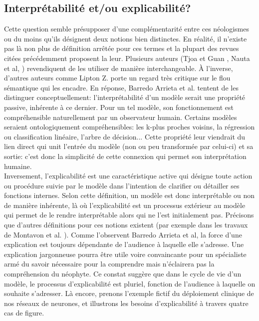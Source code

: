 \subsection{Interprétabilité et/ou explicabilité?} Cette question semble présupposer d'une complémentarité entre ces néologismes ou du moins qu'ils désignent deux notions bien distinctes. En réalité, il n'existe pas là non plus de définition arrêtée pour ces termes et la plupart des revues citées précédemment proposent la leur. Plusieurs auteurs (Tjoa et Guan \cite{tjoaSurveyExplainableArtificial2021a}, Nauta et al, \cite{nautaAnecdotalEvidenceQuantitative2023}) revendiquent de les utiliser de manière interchangeable. À l'inverse, d'autres auteurs comme Lipton Z. \cite{liptonMythosModelInterpretability2018} porte un regard très critique sur le flou sémantique qui les encadre. En réponse, Barredo Arrieta et al. \cite{barredoarrietaExplainableArtificialIntelligence2020} tentent de les distinguer conceptuellement: l'interprétabilité d'un modèle serait une propriété passive, inhérente à ce dernier. Pour un tel modèle, son fonctionnement est compréhensible naturellement par un observateur humain. Certains modèles seraient ontologiquement compréhensibles: les k-plus proches voisins, la régression ou classification linéaire, l'arbre de décision... Cette propriété leur viendrait du lien direct qui unit l'entrée du modèle (non ou peu transformée par celui-ci) et sa sortie: c'est donc la simplicité de cette connexion qui permet son interprétation humaine.
\\
Inversement, l'explicabilité est une caractéristique active qui \og{}désigne toute action ou procédure suivie par le modèle dans l'intention de clarifier ou détailler ses fonctions internes\fg{}. Selon cette définition, un modèle est donc interprétable ou non de manière inhérente, là où l'explicabilité est un processus extérieur au modèle qui permet de le rendre interprétable alors qui ne l'est initialement pas.
Précisons que d'autres définitions pour ces notions existent (par exemple dans les travaux de Montavon et al. \cite{montavonMethodsInterpretingUnderstanding2018}). 
Comme l'observent Barredo Arrieta et al, la force d'une explication est toujours dépendante de l'audience à laquelle elle s'adresse. Une explication jargonneuse pourra être utile voire convaincante pour un spécialiste armé du savoir nécessaire pour la comprendre mais n'éclairera pas la compréhension du néophyte. Ce constat suggère que dans le cycle de vie d'un modèle, le processus d'explicabilité est pluriel, fonction de l'audience à laquelle on souhaite s'adresser. Là encore, prenons l'exemple fictif du déploiement clinique de nos réseaux de neurones, et illustrons les besoins d'explicabilité à travers quatre cas de figure.
